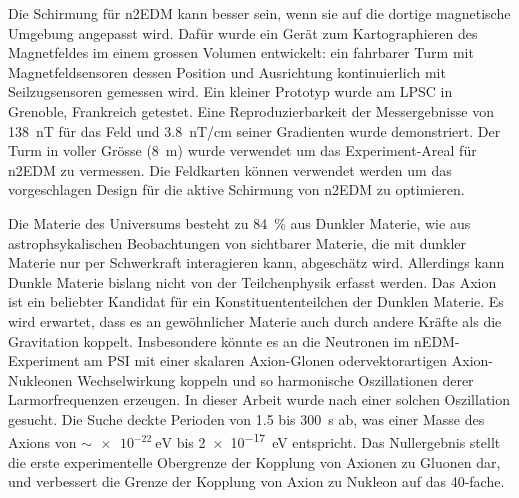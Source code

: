 Die Schirmung für n2EDM kann besser sein, wenn sie auf die dortige magnetische Umgebung angepasst wird.
Dafür wurde ein Gerät zum Kartographieren des Magnetfeldes im einem grossen Volumen entwickelt: ein fahrbarer Turm mit Magnetfeldsensoren dessen Position und Ausrichtung kontinuierlich mit Seilzugsensoren gemessen wird.
Ein kleiner Prototyp wurde am LPSC in Grenoble, Frankreich getestet. Eine Reproduzierbarkeit der Messergebnisse von \SI{138}{nT} für das Feld und \SI{3.8}{nT/cm} seiner Gradienten wurde demonstriert.
Der Turm in voller Grösse  (\SI{8}{m}) wurde verwendet um das Experiment-Areal für n2EDM zu vermessen.
Die Feldkarten können verwendet werden um das vorgeschlagen Design für die aktive Schirmung von n2EDM zu optimieren.


Die Materie des Universums besteht zu \SI{84}{\percent} aus Dunkler Materie, wie aus astrophsykalischen Beobachtungen von sichtbarer Materie, die mit dunkler Materie nur per Schwerkraft interagieren kann, abgeschätz wird.
Allerdings kann Dunkle Materie bislang nicht von der Teilchenphysik erfasst werden.
Das Axion ist ein beliebter Kandidat für ein Konstituententeilchen der Dunklen Materie.
Es wird erwartet, dass es an gewöhnlicher Materie auch durch andere Kräfte als die Gravitation koppelt.
Insbesondere könnte es an die Neutronen im nEDM-Experiment am PSI mit einer skalaren Axion-Glonen odervektorartigen Axion-Nukleonen Wechselwirkung koppeln und so harmonische Oszillationen derer Larmorfrequenzen erzeugen.
In dieser Arbeit wurde nach einer solchen Oszillation gesucht.
Die Suche deckte Perioden von \num{1.5} bis \SI{300}{\second} ab, was einer Masse des Axions von $\sim \SI{e-22}{\electronvolt}$ bis \SI{2e-17}{\electronvolt} entspricht.
Das Nullergebnis stellt die erste experimentelle Obergrenze der Kopplung von Axionen zu Gluonen dar, und verbessert die Grenze der Kopplung von Axion zu Nukleon auf das 40-fache.


\endgroup

\vfill
